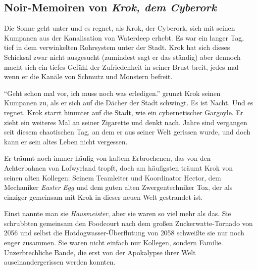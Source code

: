 \documentclass[final]{multiversum}
\begin{document}
\makemultititle
%




\subsection{Noir-Memoiren von \emph{Krok, dem Cyberork}}

Die Sonne geht unter und es regnet, als Krok, der Cyberork, sich mit seinen
Kumpanen aus der Kanalisation von Waterdeep erhebt. Es war ein langer Tag, tief
in dem verwinkelten Rohrsystem unter der Stadt. Krok hat sich dieses Schicksal
zwar nicht ausgesucht (zumindest sagt er das ständig) aber dennoch macht sich
ein tiefes Gefühl der Zufriedenheit in seiner Brust breit, jedes mal wenn er die
Kanäle von Schmutz und Monstern befreit.

\enquote{Geht schon mal vor, ich muss noch was erledigen.} grunzt Krok seinen
Kumpanen zu, als er sich auf die Dächer der Stadt schwingt. Es ist Nacht. Und es
regnet.  Krok starrt hinunter auf die Stadt, wie ein cybernetischer Gargoyle.
Er zieht ein weiteres Mal an seiner Zigarette und denkt nach. Jahre sind
vergangen seit diesem chaotischen Tag, an dem er aus seiner Welt gerissen wurde,
und doch kann er sein altes Leben nicht vergessen.

Er träumt noch immer häufig von kaltem Erbrochenen, das von den Achterbahnen von
Lofwyrland tropft, doch am häufigsten träumt Krok von seinen alten Kollegen:
Seinem Teamleiter und Koordinator Hector, dem Mechaniker \emph{Easter Egg} und
dem guten alten Zwergentechniker Tox, der als einziger gemeinsam mit Krok in
dieser neuen Welt gestrandet ist.

Einst nannte man sie \emph{Hausmeister}, aber sie waren so viel mehr als das.
Sie schrubbten gemeinsam den Foodcourt nach dem großen Zuckerwatte-Tornado von
2056 und selbst die Hotdogwasser-Überflutung von 2058 schweißte sie nur noch
enger zusammen. Sie waren nicht einfach nur Kollegen, sondern Familie.
Unzerbrechliche Bande, die erst von der Apokalypse ihrer Welt
auseinandergerissen werden konnten.
\end{document}
